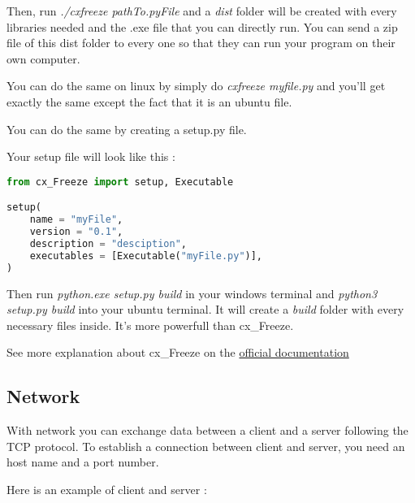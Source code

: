 \documentclass[a4paper, 12pt, titlepage]{scrartcl} %
\begin{document}
\vspace{5mm}

Then, run \textit{./cxfreeze pathTo.pyFile} and a \textit{dist} folder will be created with every libraries needed and the .exe file that you can directly run. You can send a zip file of this dist folder to every one so that they can run your program on their own computer.

\vspace{5mm}

You can do the same on linux by simply do \textit{cxfreeze myfile.py} and you'll get exactly the same except the fact that it is an ubuntu file.

\vspace{10mm}

You can do the same by creating a setup.py file.

\vspace{5mm}

Your setup file will look like this : 
\begin{lstlisting}[language=Python]
from cx_Freeze import setup, Executable

setup(
    name = "myFile",
    version = "0.1",
    description = "desciption",
    executables = [Executable("myFile.py")],
)
\end{lstlisting} \vspace{5mm}

Then run \textit{python.exe setup.py build} in your windows terminal and \textit{python3 setup.py build} into your ubuntu terminal. It will create a \textit{build} folder with every necessary files inside. It's more powerfull than cx\_Freeze.

See more explanation about cx\_Freeze on the  \href{https://cx-freeze.readthedocs.io/en/latest/}{official documentation}

\subsection{Network}
With network you can exchange data between a client and a server following the TCP protocol. To establish a connection between client and server, you need an host name and a port number. 
\vspace{5mm}


Here is an example of client and server :

\vspace{5mm}
\end{document}
